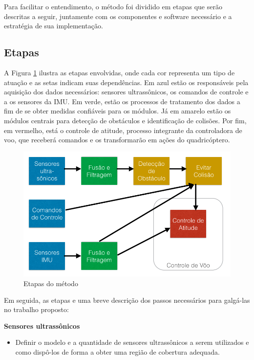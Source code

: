 \documentclass[a4paper, 12pt]{article}
\begin{document}
Para facilitar o entendimento, o método foi dividido em etapas que serão  descritas a seguir, juntamente com os componentes e software necessário e a estratégia de sua implementação.

\subsection{Etapas}

\label{subsec:etapas}

A Figura \ref{fig:etapasMetodo} ilustra as etapas envolvidas, onde cada cor representa um tipo de atuação e as setas indicam suas dependências. Em azul estão os responsáveis pela aquisição dos dados necessários: sensores ultrassônicos, os comandos de controle e a os sensores da IMU. Em verde, estão os processos de tratamento dos dados a fim de se obter medidas confiáveis para os módulos. Já em amarelo estão os módulos centrais para detecção de obstáculos e identificação de colisões. Por fim, em vermelho, está o controle de atitude, processo integrante da controladora de voo, que receberá comandos e os transformarão em ações do quadricóptero.   

\begin{figure}[h]
	\centering
	\includegraphics[scale=0.4]{img/etapasMetodo.png}
	\caption{Etapas do método}
	\label{fig:etapasMetodo}
\end{figure}

Em seguida, as etapas e uma breve descrição dos passos necessários para galgá-las no trabalho proposto:

\noindent\textbf{Sensores ultrassônicos} 
\begin{itemize}
	\item
	Definir o modelo e a quantidade de sensores ultrassônicos a serem utilizados e como dispô-los de forma a obter uma região de cobertura adequada.  
\end{itemize}
\end{document}
